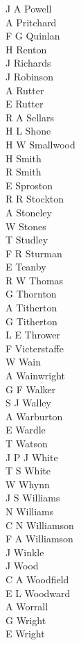 \begin{multicols}{3}
  J A Powell \\
  A Pritchard \\
  F G Quinlan \\
  H Renton \\
  J Richards \\
  J Robinson \\
  A Rutter \\
  E Rutter \\
  R A Sellars \\
  H L Shone \\
  H W Smallwood \\
  H Smith \\
  R Smith \\
  E Sproston \\
  R R Stockton \\
  A Stoneley \\
  W Stones \\
  T Studley \\
  F R Sturman \\
  E Teanby \\
  R W Thomas \\
  G Thornton \\
  A Titherton \\
  G Titherton \\
  L E Thrower \\
  F Victerstaffe \\
  W Wain \\
  A Wainwright \\
  G F Walker \\
  S J Walley \\
  A Warburton \\
  E Wardle \\
  T Watson \\
  J P J White \\
  T S White \\
  W Whynn \\
  J S Williams \\
  N Williams \\
  C N Williamson \\
  F A Williamson \\
  J Winkle \\
  J Wood \\
  C A Woodfield \\
  E L Woodward \\
  A Worrall \\
  G Wright \\
  E Wright \\
\end{multicols}

